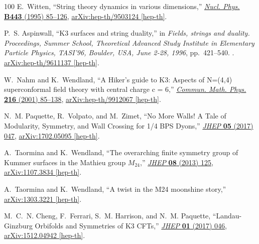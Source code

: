 \documentclass[11pt,a4paper,fontset=windows]{ctexart}
\numberwithin{equation}{section}
\begin{document}
\begin{thebibliography}{100}
E.~Witten, ``{String theory dynamics in various dimensions},''
  \href{http://dx.doi.org/10.1016/0550-3213(95)00158-O}{{\em Nucl. Phys.}
  {\bfseries B443} (1995) 85--126},
\href{http://arxiv.org/abs/hep-th/9503124}{{\ttfamily arXiv:hep-th/9503124
  [hep-th]}}.

P.~S. Aspinwall, ``{K3 surfaces and string duality},'' in {\em {Fields, strings
  and duality. Proceedings, Summer School, Theoretical Advanced Study Institute
  in Elementary Particle Physics, TASI'96, Boulder, USA, June 2-28, 1996}},
  pp.~421--540.
.
\newblock
\href{http://arxiv.org/abs/hep-th/9611137}{{\ttfamily arXiv:hep-th/9611137
  [hep-th]}}.
\newblock

W.~Nahm and K.~Wendland, ``{A Hiker's guide to K3: Aspects of N=(4,4)
  superconformal field theory with central charge c = 6},''
  \href{http://dx.doi.org/10.1007/PL00005548}{{\em Commun. Math. Phys.}
  {\bfseries 216} (2001) 85--138},
\href{http://arxiv.org/abs/hep-th/9912067}{{\ttfamily arXiv:hep-th/9912067
  [hep-th]}}.

N.~M. Paquette, R.~Volpato, and M.~Zimet, ``{No More Walls! A Tale of
  Modularity, Symmetry, and Wall Crossing for 1/4 BPS Dyons},''
  \href{http://dx.doi.org/10.1007/JHEP05(2017)047}{{\em JHEP} {\bfseries 05}
  (2017) 047},
\href{http://arxiv.org/abs/1702.05095}{{\ttfamily arXiv:1702.05095 [hep-th]}}.

A.~Taormina and K.~Wendland, ``{The overarching finite symmetry group of Kummer
  surfaces in the Mathieu group $M_{24}$},''
  \href{http://dx.doi.org/10.1007/JHEP08(2013)125}{{\em JHEP} {\bfseries 08}
  (2013) 125},
\href{http://arxiv.org/abs/1107.3834}{{\ttfamily arXiv:1107.3834 [hep-th]}}.

A.~Taormina and K.~Wendland, ``{A twist in the M24 moonshine story},''
\href{http://arxiv.org/abs/1303.3221}{{\ttfamily arXiv:1303.3221 [hep-th]}}.

M.~C.~N. Cheng, F.~Ferrari, S.~M. Harrison, and N.~M. Paquette,
  ``{Landau-Ginzburg Orbifolds and Symmetries of K3 CFTs},''
  \href{http://dx.doi.org/10.1007/JHEP01(2017)046}{{\em JHEP} {\bfseries 01}
  (2017) 046},
\href{http://arxiv.org/abs/1512.04942}{{\ttfamily arXiv:1512.04942 [hep-th]}}.


\end{thebibliography}
\end{document}
